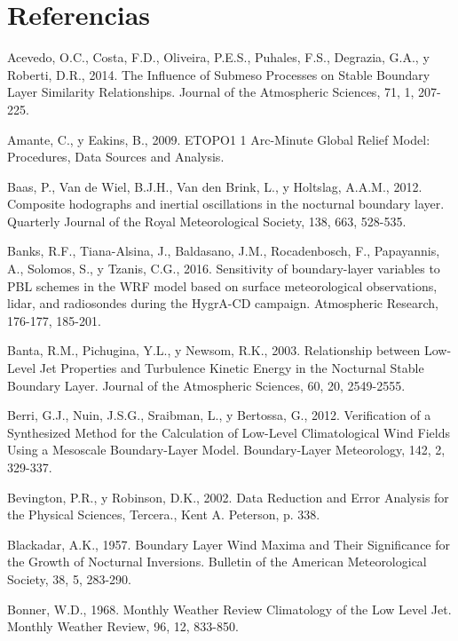 \documentclass[12pt,spanish,oneside, a4paper]{book}
\begin{document}
\chapter*{Referencias}\label{referencias}

\hypertarget{refs}{}
\hypertarget{ref-Acevedo2014}{}
Acevedo, O.C., Costa, F.D., Oliveira, P.E.S., Puhales, F.S., Degrazia,
G.A., y Roberti, D.R., 2014. The Influence of Submeso Processes on
Stable Boundary Layer Similarity Relationships. Journal of the
Atmospheric Sciences, 71, 1, 207-225.

\hypertarget{ref-Amante2009}{}
Amante, C., y Eakins, B., 2009. ETOPO1 1 Arc-Minute Global Relief Model:
Procedures, Data Sources and Analysis.

\hypertarget{ref-Baas2012}{}
Baas, P., Van de Wiel, B.J.H., Van den Brink, L., y Holtslag, A.A.M.,
2012. Composite hodographs and inertial oscillations in the nocturnal
boundary layer. Quarterly Journal of the Royal Meteorological Society,
138, 663, 528-535.

\hypertarget{ref-Banks2016}{}
Banks, R.F., Tiana-Alsina, J., Baldasano, J.M., Rocadenbosch, F.,
Papayannis, A., Solomos, S., y Tzanis, C.G., 2016. Sensitivity of
boundary-layer variables to PBL schemes in the WRF model based on
surface meteorological observations, lidar, and radiosondes during the
HygrA-CD campaign. Atmospheric Research, 176-177, 185-201.

\hypertarget{ref-Banta2003}{}
Banta, R.M., Pichugina, Y.L., y Newsom, R.K., 2003. Relationship between
Low-Level Jet Properties and Turbulence Kinetic Energy in the Nocturnal
Stable Boundary Layer. Journal of the Atmospheric Sciences, 60, 20,
2549-2555.

\hypertarget{ref-Berri2012}{}
Berri, G.J., Nuin, J.S.G., Sraibman, L., y Bertossa, G., 2012.
Verification of a Synthesized Method for the Calculation of Low-Level
Climatological Wind Fields Using a Mesoscale Boundary-Layer Model.
Boundary-Layer Meteorology, 142, 2, 329-337.

\hypertarget{ref-Bevington2002}{}
Bevington, P.R., y Robinson, D.K., 2002. Data Reduction and Error
Analysis for the Physical Sciences, Tercera., Kent A. Peterson, p. 338.

\hypertarget{ref-Blackadar1957}{}
Blackadar, A.K., 1957. Boundary Layer Wind Maxima and Their Significance
for the Growth of Nocturnal Inversions. Bulletin of the American
Meteorological Society, 38, 5, 283-290.

\hypertarget{ref-Bonner1968}{}
Bonner, W.D., 1968. Monthly Weather Review Climatology of the Low Level
Jet. Monthly Weather Review, 96, 12, 833-850.
\end{document}
